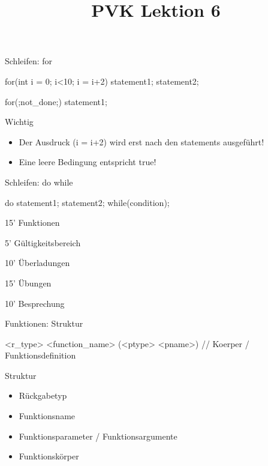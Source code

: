 \ifnum\conditionmacro=1 \documentclass[handout,usenames,dvipsnames]{beamer}\fi
\begin{document}

\begin{frame}[fragile]{Schleifen: for}
\begin{TPCpp}
for(int i = 0; i<10; i = i+2){
	statement1;
	statement2;
}


for(;not_done;){
	statement1;
}
\end{TPCpp}

\begin{block}{Wichtig}
\begin{itemize}
\item Der Ausdruck (i = i+2) wird erst nach den statements ausgeführt!
\item Eine leere Bedingung entspricht true!
\end{itemize}
\end{block}

\end{frame}

\begin{frame}[fragile]{Schleifen: do while}
\begin{TPCpp}
do{
	statement1;
	statement2;
}
while(condition);
\end{TPCpp}
\end{frame}

\title{PVK Lektion 6}

\maketitle

\begin{TFTimeSchedule}
\item 15' Funktionen
\item 5' Gültigkeitsbereich
\item 10' Überladungen
\item 15' Übungen
\item 10' Besprechung
\end{TFTimeSchedule}

\begin{frame}[fragile]{Funktionen: Struktur}
\begin{TPCpp}
<r_type> <function_name> (<ptype> <pname>)
{
	// Koerper / Funktionsdefinition
}
\end{TPCpp}

\begin{block}{Struktur}
\begin{itemize}
\item Rückgabetyp
\item Funktionsname
\item Funktionsparameter / Funktionsargumente
\item Funktionskörper
\end{itemize}
\end{block}
\end{frame}
\end{document}
